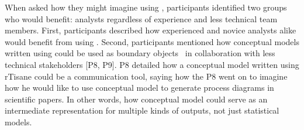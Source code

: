 \begin{comment}
Nevertheless, participants expected \rTisane to do more automatically.
Participants were expected rTisane’s output statistical model to include more
IVs [P2, P5], have interaction terms [P5, P6], and have coefficient values that
were similar to ones from their own statistical models without rTisane [P10].
Yet, when asked if anything surprised them about rTisane’s output statistical
model, six participants said the models were as they expected [P4, 6, 10, 11,
12, 13]. 
\end{comment}



When asked how they might imagine using \rTisane, participants identified two
groups who would benefit: analysts regardless of experience and less technical
team members. First, participants described how experienced and novice analysts
alike would benefit from using \rTisane [P2, P4, P9, P10, P12]. Second,
participants mentioned how conceptual models written using \rTisane could be
used as boundary objects~\cite{star1989boundaryObjects} in collaboration with less technical
stakeholders [P8, P9]. P8 detailed how a conceptual model written using rTisane
could be a communication tool, saying how the  P8 went on to imagine how he would like to
use \rTisanes conceptual model to generate process diagrams in scientific
papers. In other words, how \rTisanes conceptual model could serve as an
intermediate representation for multiple kinds of outputs, not just statistical
models. 


